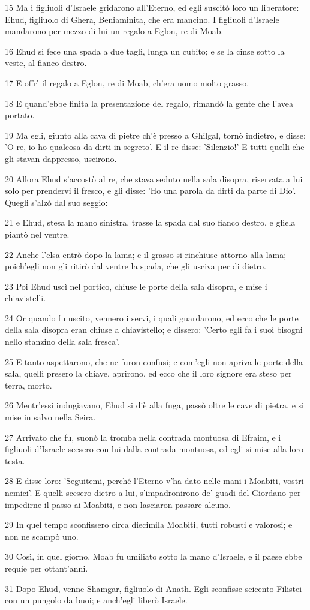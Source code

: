 \par 15 Ma i figliuoli d'Israele gridarono all'Eterno, ed egli suscitò loro un liberatore: Ehud, figliuolo di Ghera, Beniaminita, che era mancino. I figliuoli d'Israele mandarono per mezzo di lui un regalo a Eglon, re di Moab.
\par 16 Ehud si fece una spada a due tagli, lunga un cubito; e se la cinse sotto la veste, al fianco destro.
\par 17 E offrì il regalo a Eglon, re di Moab, ch'era uomo molto grasso.
\par 18 E quand'ebbe finita la presentazione del regalo, rimandò la gente che l'avea portato.
\par 19 Ma egli, giunto alla cava di pietre ch'è presso a Ghilgal, tornò indietro, e disse: 'O re, io ho qualcosa da dirti in segreto'. E il re disse: 'Silenzio!' E tutti quelli che gli stavan dappresso, uscirono.
\par 20 Allora Ehud s'accostò al re, che stava seduto nella sala disopra, riservata a lui solo per prendervi il fresco, e gli disse: 'Ho una parola da dirti da parte di Dio'. Quegli s'alzò dal suo seggio:
\par 21 e Ehud, stesa la mano sinistra, trasse la spada dal suo fianco destro, e gliela piantò nel ventre.
\par 22 Anche l'elsa entrò dopo la lama; e il grasso si rinchiuse attorno alla lama; poich'egli non gli ritirò dal ventre la spada, che gli usciva per di dietro.
\par 23 Poi Ehud uscì nel portico, chiuse le porte della sala disopra, e mise i chiavistelli.
\par 24 Or quando fu uscito, vennero i servi, i quali guardarono, ed ecco che le porte della sala disopra eran chiuse a chiavistello; e dissero: 'Certo egli fa i suoi bisogni nello stanzino della sala fresca'.
\par 25 E tanto aspettarono, che ne furon confusi; e com'egli non apriva le porte della sala, quelli presero la chiave, aprirono, ed ecco che il loro signore era steso per terra, morto.
\par 26 Mentr'essi indugiavano, Ehud si diè alla fuga, passò oltre le cave di pietra, e si mise in salvo nella Seira.
\par 27 Arrivato che fu, suonò la tromba nella contrada montuosa di Efraim, e i figliuoli d'Israele scesero con lui dalla contrada montuosa, ed egli si mise alla loro testa.
\par 28 E disse loro: 'Seguitemi, perché l'Eterno v'ha dato nelle mani i Moabiti, vostri nemici'. E quelli scesero dietro a lui, s'impadronirono de' guadi del Giordano per impedirne il passo ai Moabiti, e non lasciaron passare alcuno.
\par 29 In quel tempo sconfissero circa diecimila Moabiti, tutti robusti e valorosi; e non ne scampò uno.
\par 30 Così, in quel giorno, Moab fu umiliato sotto la mano d'Israele, e il paese ebbe requie per ottant'anni.
\par 31 Dopo Ehud, venne Shamgar, figliuolo di Anath. Egli sconfisse seicento Filistei con un pungolo da buoi; e anch'egli liberò Israele.

